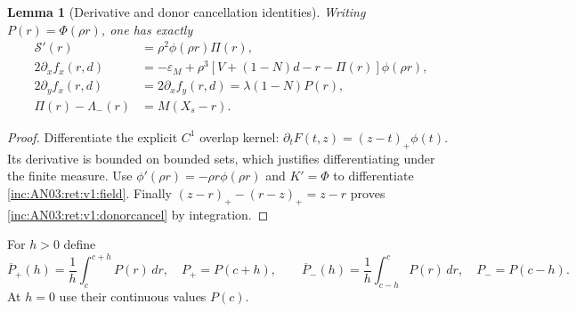 \documentclass[11pt]{article}
\numberwithin{equation}{section}
\newtheorem{lemma}[theorem]{Lemma}
\theoremstyle{remark}\newtheorem{remark}[theorem]{Remark}
\newcommand{\dd}{\,d}
\newcommand{\1}{\mathbf 1}
\begin{document}
\begin{lemma}[Derivative and donor cancellation identities]
\label{inc:AN03:ret:v1:jacobian}
Writing $P(r)=\Phi(\rho r)$, one has exactly
\begin{align}
 \mathcal S'(r)&=\rho^2\phi(\rho r)\Pi(r),\nonumber\\
 2\partial_xf_x(r,d)&=-\varepsilon_M+
 \rho^3[V+(1-N)d-r-\Pi(r)]\phi(\rho r),\label{inc:AN03:ret:v1:dx}\\
 2\partial_yf_x(r,d)&=2\partial_xf_y(r,d)=\lambda(1-N)P(r),\nonumber\\
 \Pi(r)-\Lambda_-(r)&=M(X_s-r).\label{inc:AN03:ret:v1:donorcancel}
\end{align}
\end{lemma}
\begin{proof}
Differentiate the explicit $C^1$ overlap kernel:
$\partial_tF(t,z)=(z-t)_+\phi(t)$.
Its derivative is bounded on bounded sets, which justifies differentiating
under the finite measure. Use $\phi'(\rho r)=-\rho r\phi(\rho r)$
and $K'=\Phi$ to differentiate \eqref{inc:AN03:ret:v1:field}.
Finally $(z-r)_+-(r-z)_+=z-r$ proves
\eqref{inc:AN03:ret:v1:donorcancel} by integration.
\end{proof}

For $h>0$ define
\[
 \overline P_+(h)=\frac1h\int_c^{c+h}P(r)\dd r,
 \quad P_+=P(c+h),\qquad
 \overline P_-(h)=\frac1h\int_{c-h}^{c}P(r)\dd r,
 \quad P_-=P(c-h).
\]
At $h=0$ use their continuous values $P(c)$.
\end{document}
